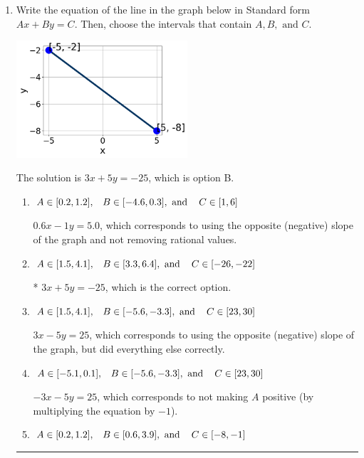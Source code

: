 \documentclass{extbook}[14pt]
\newcommand{\litem}[1]{\item #1

\rule{\textwidth}{0.4pt}}
\begin{document}
\begin{enumerate}\litem{
Write the equation of the line in the graph below in Standard form $Ax+By=C$. Then, choose the intervals that contain $A, B, \text{ and } C$.

\begin{center}
    \includegraphics[width=0.5\textwidth]{../Figures/linearGraphToStandardCopyA.png}
\end{center}




The solution is \( 3x + 5y = -25 \), which is option B.\begin{enumerate}[label=\Alph*.]
\item \( A \in [0.2, 1.2], \hspace{3mm} B \in [-4.6, 0.3], \text{ and } \hspace{3mm} C \in [1, 6] \)

 $0.6x - 1y = 5.0$, which corresponds to using the opposite (negative) slope of the graph and not removing rational values.
\item \( A \in [1.5, 4.1], \hspace{3mm} B \in [3.3, 6.4], \text{ and } \hspace{3mm} C \in [-26, -22] \)

* $3x + 5y = -25$, which is the correct option.
\item \( A \in [1.5, 4.1], \hspace{3mm} B \in [-5.6, -3.3], \text{ and } \hspace{3mm} C \in [23, 30] \)

 $3x - 5y = 25$, which corresponds to using the opposite (negative) slope of the graph, but did everything else correctly.
\item \( A \in [-5.1, 0.1], \hspace{3mm} B \in [-5.6, -3.3], \text{ and } \hspace{3mm} C \in [23, 30] \)

 $-3x - 5y = 25$, which corresponds to not making $A$ positive (by multiplying the equation by $-1$).
\item \( A \in [0.2, 1.2], \hspace{3mm} B \in [0.6, 3.9], \text{ and } \hspace{3mm} C \in [-8, -1] \)


\end{enumerate}}
\end{enumerate}
\end{document}
